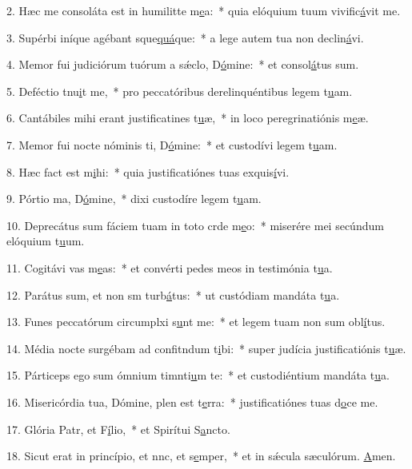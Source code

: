 2. Hæc me consoláta est in humilitte m\uline{e}a:~* quia elóquium tuum vivific\uline{á}vit me.\par 
3. Supérbi iníque agébant sque\uline{quá}que:~* a lege autem tua non declin\uline{á}vi.\par 
4. Memor fui judiciórum tuórum a sǽclo, D\uline{ó}mine:~* et consol\uline{á}tus sum.\par 
5. Deféctio tnu\uline{i}t me,~* pro peccatóribus derelinquéntibus legem t\uline{u}am.\par 
6. Cantábiles mihi erant justificatines t\uline{u}æ,~* in loco peregrinatiónis m\uline{e}æ.\par 
7. Memor fui nocte nóminis ti, D\uline{ó}mine:~* et custodívi legem t\uline{u}am.\par 
8. Hæc fact est m\uline{i}hi:~* quia justificatiónes tuas exquis\uline{í}vi.\par 
9. Pórtio ma, D\uline{ó}mine,~* dixi custodíre legem t\uline{u}am.\par 
10. Deprecátus sum fáciem tuam in toto crde m\uline{e}o:~* miserére mei secúndum elóquium t\uline{u}um.\par 
11. Cogitávi vas m\uline{e}as:~* et convérti pedes meos in testimónia t\uline{u}a.\par 
12. Parátus sum, et non sm turb\uline{á}tus:~* ut custódiam mandáta t\uline{u}a.\par 
13. Funes peccatórum circumplxi s\uline{u}nt me:~* et legem tuam non sum obl\uline{í}tus.\par 
14. Média nocte surgébam ad confitndum t\uline{i}bi:~* super judícia justificatiónis t\uline{u}æ.\par 
15. Párticeps ego sum ómnium timnti\uline{u}m te:~* et custodiéntium mandáta t\uline{u}a.\par 
16. Misericórdia tua, Dómine, plen est t\uline{e}rra:~* justificatiónes tuas d\uline{o}ce me.\par 
17. Glória Patr, et F\uline{í}lio,~* et Spirítui S\uline{a}ncto.\par 
18. Sicut erat in princípio, et nnc, et s\uline{e}mper,~* et in sǽcula sæculórum. \uline{A}men.\par 
